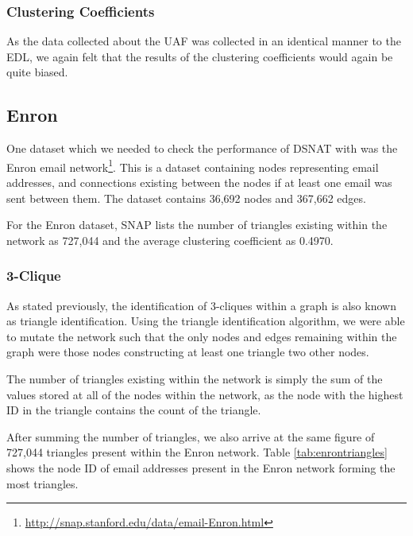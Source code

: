 \subsubsection{Clustering Coefficients}
As the data collected about the UAF was collected in an identical manner to the EDL, we again felt that the results of the clustering coefficients would again be quite biased.

\subsection{Enron}
One dataset which we needed to check the performance of DSNAT with was the Enron email network\footnote{\url{http://snap.stanford.edu/data/email-Enron.html}}. This is a dataset containing nodes representing email addresses, and connections existing between the nodes if at least one email was sent between them. The dataset contains 36,692 nodes and 367,662 edges.

For the Enron dataset, SNAP lists the number of triangles existing within the network as 727,044 and the average clustering coefficient as 0.4970. 

\subsubsection{3-Clique}
As stated previously, the identification of 3-cliques within a graph is also known as triangle identification. Using the triangle identification algorithm, we were able to mutate the network such that the only nodes and edges remaining within the graph were those nodes constructing at least one triangle two other nodes.

The number of triangles existing within the network is simply the sum of the values stored at all of the nodes within the network, as the node with the highest ID in the triangle contains the count of the triangle.

After summing the number of triangles, we also arrive at the same figure of 727,044 triangles present within the Enron network. Table \ref{tab:enrontriangles} shows the node ID of email addresses present in the Enron network forming the most triangles.

